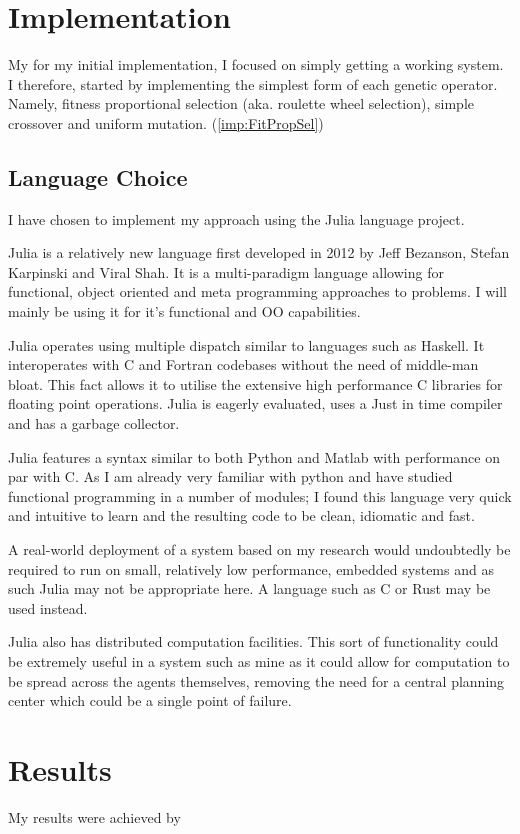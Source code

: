 \section{Implementation} 
My for my initial implementation, I focused on simply getting a working system. I therefore, started by implementing the simplest form of each genetic operator. Namely, fitness proportional selection (aka. roulette wheel selection), simple crossover and uniform mutation. (\ref{imp:FitPropSel})

\subsection{Language Choice}

I have chosen to implement my approach using the Julia language project\cite{JuliaProgrammingLanguage}.

Julia is a relatively new language first developed in 2012 by Jeff Bezanson, Stefan Karpinski and Viral Shah. It is a multi-paradigm language allowing for functional, object oriented and meta programming approaches to problems. I will mainly be using it for it's functional and OO capabilities. 

Julia operates using multiple dispatch similar to languages such as Haskell. It interoperates with C and Fortran codebases without the need of middle-man bloat. This fact allows it to utilise the extensive high performance C libraries for floating point operations. Julia is eagerly evaluated, uses a Just in time compiler and has a garbage collector.

Julia features a syntax similar to both Python and Matlab with performance on par with C. As I am already very familiar with python and have studied functional programming in a number of modules; I found this language very quick and intuitive to learn and the resulting code to be clean, idiomatic and fast.

A real-world deployment of a system based on my research would undoubtedly be required to run on small, relatively low performance, embedded systems and as such Julia may not be appropriate here. A language such as C or Rust may be used instead.

Julia also has distributed computation facilities. This sort of functionality could be extremely useful in a system such as mine as it could allow for computation to be spread across the agents themselves, removing the need for a central planning center which could be a single point of failure.
\section{Results}

My results were achieved by

